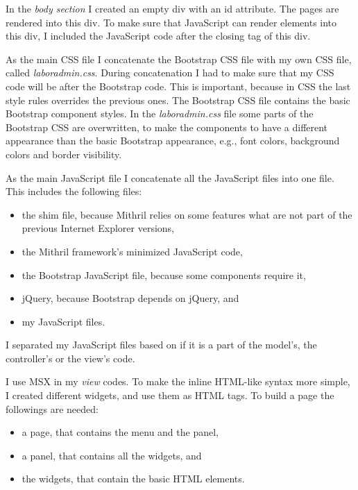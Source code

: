 In the \emph{body section} I created an empty div with an id attribute. The pages are rendered into this div. To make sure that JavaScript can render elements into this div, I included the JavaScript code after the closing tag of this div.

As the main CSS file I concatenate the Bootstrap CSS file with my own CSS file, called \mbox{\emph{laboradmin.css}}. During concatenation I had to make sure that my CSS code will be after the Bootstrap code. This is important, because in CSS the last style rules overrides the previous ones. The Bootstrap CSS file contains the basic Bootstrap component styles. In the \mbox{\emph{laboradmin.css}} file some parts of the Bootstrap CSS are overwritten, to make the components to have a different appearance than the basic Bootstrap appearance, e.g., font colors, background colors and border visibility.



As the main JavaScript file I concatenate all the JavaScript files into one file. This includes the following files: 
\begin{itemize}
	\item the shim file, because Mithril relies on some features what are not part of the previous Internet Explorer versions,
	\item the Mithril framework's minimized JavaScript code,
	\item the Bootstrap JavaScript file, because some components require it,
	\item jQuery, because Bootstrap depends on jQuery, and
	\item my JavaScript files.
\end{itemize}


I separated my JavaScript files based on if it is a part of the model's, the controller's or the view's code. 

I use MSX in my \emph{view} codes. To make the inline HTML-like syntax more simple, I created different widgets, and use them as HTML tags. To build a page the followings are needed: 
\begin{itemize}
	\item a page, that contains the menu and the panel,
	\item a panel, that contains all the widgets, and
	\item the widgets, that contain the basic HTML elements.
\end{itemize}

